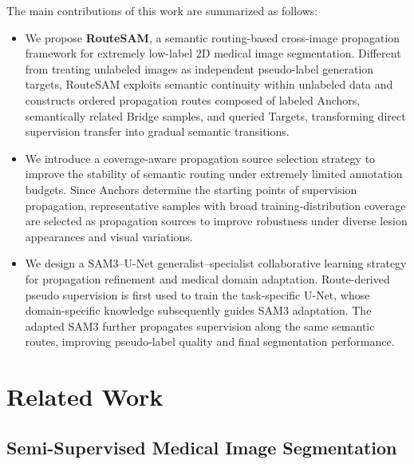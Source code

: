 \documentclass[a4paper,fleqn]{cas-dc}
\begin{document}
The main contributions of this work are summarized as follows:

\begin{itemize}

\item 
We propose \textbf{RouteSAM}, a semantic routing-based cross-image propagation framework for extremely low-label 2D medical image segmentation. Different from treating unlabeled images as independent pseudo-label generation targets, RouteSAM exploits semantic continuity within unlabeled data and constructs ordered propagation routes composed of labeled Anchors, semantically related Bridge samples, and queried Targets, transforming direct supervision transfer into gradual semantic transitions.

\item 
We introduce a coverage-aware propagation source selection strategy to improve the stability of semantic routing under extremely limited annotation budgets. Since Anchors determine the starting points of supervision propagation, representative samples with broad training-distribution coverage are selected as propagation sources to improve robustness under diverse lesion appearances and visual variations.

\item 
We design a SAM3--U-Net generalist--specialist collaborative learning strategy for propagation refinement and medical domain adaptation. Route-derived pseudo supervision is first used to train the task-specific U-Net, whose domain-specific knowledge subsequently guides SAM3 adaptation. The adapted SAM3 further propagates supervision along the same semantic routes, improving pseudo-label quality and final segmentation performance.

\end{itemize}






\section{Related Work}

\subsection{Semi-Supervised Medical Image Segmentation}
\end{document}
